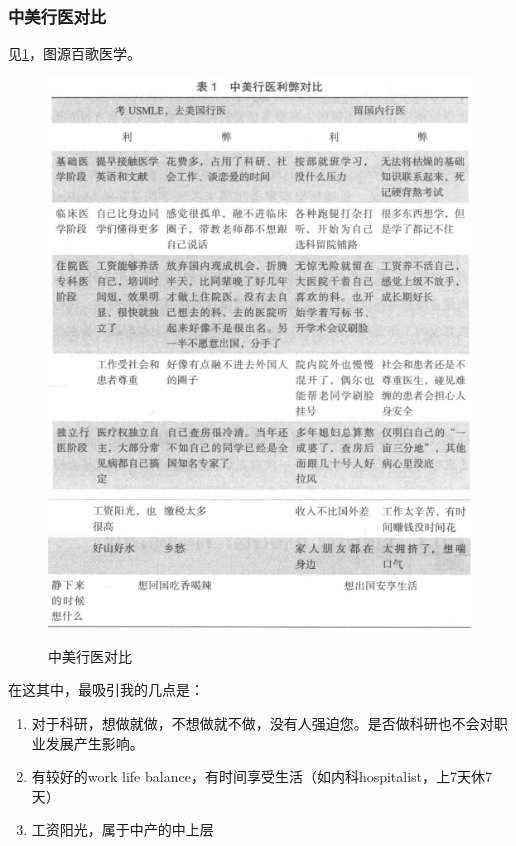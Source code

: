 \documentclass[zihao=-4,fontset=none]{Beautybook-CN}
\begin{document}
\subsubsection{中美行医对比}
见\ref{fig:compare}，图源百歌医学。
\begin{figure}[htbp]
    \centering
    \includegraphics[width=\linewidth]{media/image2.png}
    \includegraphics[width=\linewidth]{media/image3.png}
    \caption{中美行医对比}
    \label{fig:compare}
\end{figure}

在这其中，最吸引我的几点是：
\begin{enumerate}
\item 对于科研，想做就做，不想做就不做，没有人强迫您。是否做科研也不会对职业发展产生影响。
\item 有较好的work life balance，有时间享受生活（如内科hospitalist，上7天休7天）
\item 工资阳光，属于中产的中上层
\end{enumerate}
\end{document}
